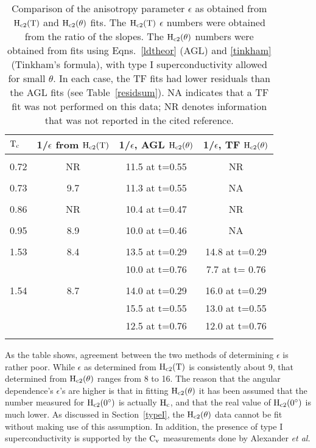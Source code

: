 \begin{table}
\caption[Comparison of the anisotropy parameter $\epsilon$ as obtained from
$\rm  H_{c2}(T)$   and  $\rm   H_{c2}(\theta)$  fits.]{Comparison    of the
anisotropy parameter  $\epsilon$ as  obtained from $\rm H_{c2}(T)$ and $\rm
H_{c2}(\theta)$ fits.  The $\rm H_{c2}(T)$ $\epsilon$ numbers were obtained
from the ratio  of  the    slopes.  The $\rm H_{c2}(\theta)$ numbers   were
obtained   from  fits  using  Eqns.~\ref{ldtheor}  (AGL) and  \ref{tinkham}
(Tinkham's  formula), with   type  I  superconductivity allowed  for  small
$\theta$.  In each case, the TF fits had lower  residuals than the AGL fits
(see Table~\ref{residsum}).   NA indicates that a TF  fit was   not
performed on this data;  NR denotes 
 information that was not reported in the cited reference.}
\label{epstab}
\begin{center}
\begin{tabular}{|l|ccc|}
\hline
$\rm T_c$ & 1/$\epsilon$ from $\rm H_{c2}(T)$ & 1/$\epsilon$, AGL $\rm
H_{c2}(\theta)$ & 1/$\epsilon$, TF $\rm H_{c2}(\theta)$  \\
\hline
& & & \\
0.72\cite{iye82} & NR & 11.5 at t=0.55 & NR \\
& & & \\
0.73\cite{iye82} & 9.7 & 11.3 at t=0.55 & NA \\
& & & \\
0.86\cite{iye82} & NR & 10.4 at t=0.47 & NR \\
& & & \\
0.95 & 8.9 & 10.0 at t=0.46 & NA \\
& & & \\
1.53 & 8.4 & 13.5 at t=0.29 & 14.8 at t=0.29 \\
& & 10.0 at t=0.76 & 7.7 at t= 0.76 \\
& & & \\
1.54 & 8.7 & 14.0 at t=0.29 & 16.0 at t=0.29\\
& & 15.5 at t=0.55  & 13.0 at t=0.55\\
& & 12.5 at t=0.76 & 12.0 at t=0.76\\
& & & \\
\hline
\end{tabular}
\end{center}
\end{table}

        As  the table  shows,    agreement  between the   two   methods  of
determining $\epsilon$ is rather poor.  While $\epsilon$ as determined from
$\rm   H_{c2}(T)$  is consistently   about  9, that  determined   from $\rm
H_{c2}(\theta)$  ranges  from  8  to 16.    The   reason that the   angular
dependence's  $\epsilon$'s    are   higher   is  that   in   fitting   $\rm
H_{c2}(\theta)$ it has   been assumed  that  the number  measured  for $\rm
H_{c2}(0^{\circ})$ is actually $\rm H_c$,  and  that the real value of $\rm
H_{c2}(0^{\circ})$ is much lower.  As discussed in Section~\ref{typeI}, the
$\rm H_{c2}(\theta)$ data   cannot  be fit    without  making  use of  this
assumption.   In addition, the presence  of   type   I superconductivity is
supported by   the   $\rm  C_v$  measurements    done  by    Alexander
{\em et al.}\cite{alexander81}

